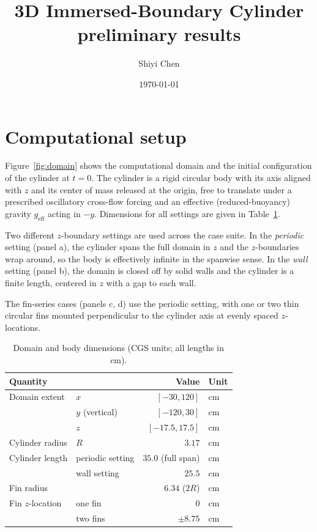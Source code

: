 \documentclass[11pt]{article}
\title{3D Immersed-Boundary Cylinder preliminary results}
\author{Shiyi Chen}
\date{\today}
\begin{document}
\maketitle

\section{Computational setup}

Figure~\ref{fig:domain} shows the computational domain and the initial
configuration of the cylinder at $t = 0$. The cylinder is a rigid circular
body with its axis aligned with $z$ and its center of mass released at the
origin, free to translate under a prescribed oscillatory cross-flow forcing
and an effective (reduced-buoyancy) gravity $g_{\mathrm{eff}}$ acting in
$-y$. Dimensions for all settings are given in Table~\ref{tab:dims}.

Two different $z$-boundary settings are used across the case suite. In the
\emph{periodic} setting (panel a), the cylinder spans the full domain in $z$
and the $z$-boundaries wrap around, so the body is effectively infinite in
the spanwise sense. In the \emph{wall} setting (panel b), the domain is
closed off by solid walls and the cylinder is a finite length, centered in
$z$ with a gap to each wall.

The fin-series cases (panels c, d) use the periodic setting, with one or two
thin circular fins mounted perpendicular to the cylinder axis at evenly
spaced $z$-locations.

\begin{table}[h]
    \centering
    \caption{Domain and body dimensions (CGS units; all lengths in cm).}
    \label{tab:dims}
    \begin{tabular}{llrl}
        \toprule
        Quantity & & Value & Unit \\
        \midrule
        Domain extent & $x$ & $[-30, 120]$ & $\mathrm{cm}$ \\
                       & $y$ (vertical) & $[-120, 30]$ & $\mathrm{cm}$ \\
                       & $z$ & $[-17.5, 17.5]$ & $\mathrm{cm}$ \\
        Cylinder radius & $R$ & $3.17$ & $\mathrm{cm}$ \\
        Cylinder length & periodic setting & $35.0$ (full span) & $\mathrm{cm}$ \\
                         & wall setting & $25.5$ & $\mathrm{cm}$ \\
        Fin radius & & $6.34$ ($2R$) & $\mathrm{cm}$ \\
        Fin $z$-location & one fin & $0$ & $\mathrm{cm}$ \\
                          & two fins & $\pm 8.75$ & $\mathrm{cm}$ \\
        \bottomrule
    \end{tabular}
\end{table}
\end{document}
